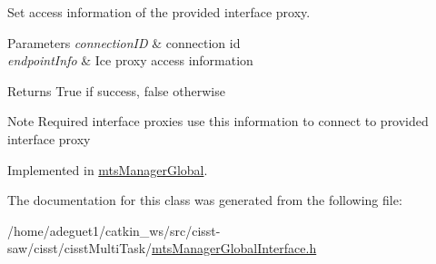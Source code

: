 Set access information of the provided interface proxy. 


\begin{DoxyParams}{Parameters}
{\em connection\-I\-D} & connection id \\
\hline
{\em endpoint\-Info} & Ice proxy access information \\
\hline
\end{DoxyParams}
\begin{DoxyReturn}{Returns}
True if success, false otherwise 
\end{DoxyReturn}
\begin{DoxyNote}{Note}
Required interface proxies use this information to connect to provided interface proxy 
\end{DoxyNote}


Implemented in \hyperlink{classmts_manager_global_a27ab6be87f292f862b05551bf786bcfd}{mts\-Manager\-Global}.



The documentation for this class was generated from the following file\-:\begin{DoxyCompactItemize}
\item 
/home/adeguet1/catkin\-\_\-ws/src/cisst-\/saw/cisst/cisst\-Multi\-Task/\hyperlink{mts_manager_global_interface_8h}{mts\-Manager\-Global\-Interface.\-h}\end{DoxyCompactItemize}
